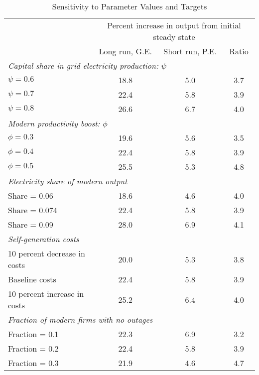 \begin{table}[H] 
\center 
\singlespace 
\caption{Sensitivity to Parameter Values and Targets} \label{sensitivity}
\vspace{-.1in} 
\begin{tabular}{l c c c}\hline 
 & \multicolumn{3}{c}{Percent increase in output from initial steady state} \\ 
\cline{2-4} 
  & Long run, G.E.& Short run, P.E.   & Ratio\\ [.5ex] 
\hline 
 \multicolumn{3}{l}{\emph{Capital share in grid electricity production: $\psi$}} \\ 
\hline 
 $\psi = 0.6$ &      18.8 &      5.0   &      3.7  \\  $\psi = 0.7$ &     22.4 &      5.8   &      3.9   \\  $\psi = 0.8$ &     26.6 &      6.7   &      4.0 \\  \hline 
 \multicolumn{3}{l}{\emph{Modern productivity boost: $\phi$}} \\ 
\hline 
 $\phi = 0.3$ &      19.6 &      5.6  &      3.5  \\  $\phi = 0.4$ &     22.4 &      5.8 &      3.9 \\  $\phi = 0.5$ &     25.5 &      5.3 &      4.8 \\  \hline 
 \multicolumn{3}{l}{\emph{Electricity share of modern output}} \\ 
\hline 
Share = 0.06 &     18.6 &      4.6 &      4.0 \\  Share = 0.074 &      22.4 &      5.8 &      3.9  \\  Share = 0.09 &     28.0 &      6.9 &      4.1  \\  \hline 
 \multicolumn{3}{l}{\emph{Self-generation costs}} \\ 
\hline 
10 percent decrease in costs &      20.0 &      5.3 &      3.8  \\  Baseline costs &     22.4 &      5.8 &      3.9  \\  10 percent increase in costs &      25.2 &      6.4 &      4.0 \\  \hline 
 \multicolumn{3}{l}{\emph{Fraction of modern firms with no outages}} \\ 
\hline 
Fraction = 0.1 &      22.3 &      6.9 &      3.2  \\  Fraction  = 0.2 &     22.4 &      5.8 &      3.9 \\  Fraction = 0.3 &      21.9 &      4.6 &      4.7  \\  \hline 
\end{tabular}
\end{table} 
